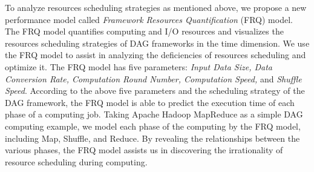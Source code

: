 






{\color{blue}
To analyze resources scheduling strategies as mentioned above, we propose a new performance model called \textit{Framework Resources Quantification} (FRQ) model. The FRQ model quantifies computing and I/O resources and visualizes the resources scheduling strategies of DAG frameworks in the time dimension. We use the FRQ model to assist in analyzing the deficiencies of resources scheduling and optimize it. 
The FRQ model has five parameters: \textit{Input Data Size, Data Conversion Rate, Computation Round Number, Computation Speed,} and \textit{Shuffle  Speed}.
According to the above five parameters and the scheduling strategy of the DAG framework, the FRQ model is able to predict the execution time of each phase of a computing job. 
Taking Apache Hadoop MapReduce as a simple DAG computing example, we model each phase of the computing by the FRQ model, including Map, Shuffle, and Reduce.
By revealing the relationships between the various phases, the FRQ model assists us in discovering the irrationality of resource scheduling during computing.
}

